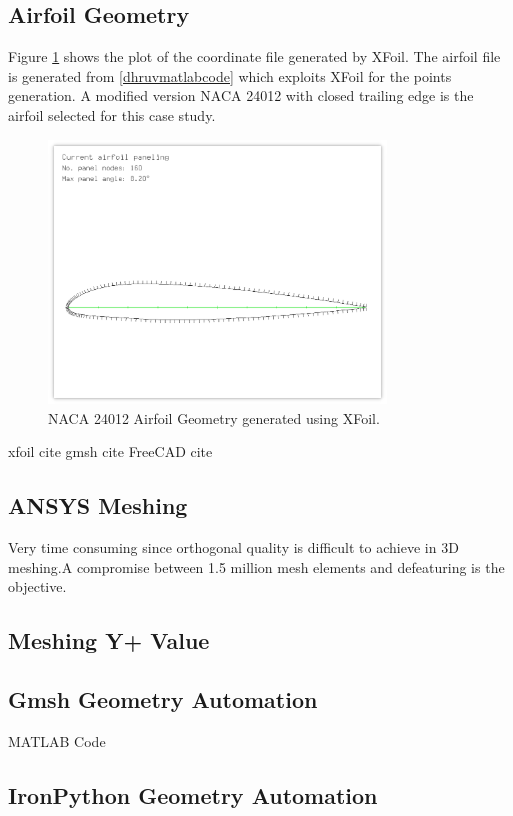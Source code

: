 \documentclass[english]{kththesis}
\begin{document}
\subsection{Airfoil Geometry} \label{subsec:airfoil_geometry}
Figure \ref{fig:xfoil2} shows the plot of the coordinate file generated by XFoil.
The airfoil file is generated from \ref{dhruvmatlabcode} which exploits XFoil for the points generation. A modified version NACA 24012 with closed trailing edge is the airfoil selected for this case study. 
\begin{figure}[!htb]
    \centering
    \includegraphics[width=0.8\textwidth]{IPS/xfoil2.png}
    \caption{NACA 24012 Airfoil Geometry generated using XFoil.}
    \label{fig:xfoil2}
\end{figure}
xfoil cite\cite{xfoil}
gmsh cite\cite{gmsh}
FreeCAD cite
\subsection{ANSYS Meshing}
Very time consuming since orthogonal quality is difficult to achieve in 3D meshing.A compromise between 1.5 million mesh elements and defeaturing is the objective.
\subsection{Meshing Y+ Value}
\subsection{Gmsh Geometry Automation} \label{subsec:gmsh_geometry}
MATLAB Code
\subsection{IronPython Geometry Automation} \label{subsec:ironpython_geometry}
\end{document}
